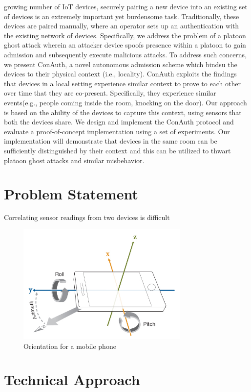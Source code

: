\documentclass[journal]{IEEEtranTIE}
\begin{document}
growing number of IoT devices, securely pairing a new device into an existing
set of devices is an extremely important yet burdensome task. Traditionally,
these devices are paired manually, where an operator sets up an authentication
with the existing network of devices. Specifically, we address the problem of a
platoon ghost attack wherein an attacker device spoofs presence within a platoon
to gain admission and subsequently execute malicious attacks. To address such
concerns, we present ConAuth, a novel autonomous admission scheme which bindsu
the devices to their physical context (i.e., locality). ConAuth exploits the
findings that devices in a local setting experience similar context to prove to
each other over time that they are co-present. Specifically, they experience
similar events(e.g., people coming inside the room, knocking on the door). Our
approach is based on the ability of the devices to capture this context, using
sensors that both the devices share. We design and implement the ConAuth
protocol and evaluate a proof-of-concept implementation using a set of
experiments. Our implementation will demonstrate that devices in the same room
can be sufficiently distinguished by their context and this can be utilized to
thwart platoon ghost attacks and similar misbehavior.

\section{Problem Statement}

Correlating sensor readings from two devices is difficult

\begin{figure}[!t]\centering
	\includegraphics[width=8.5cm]{phoneOrientation}
	\caption{Orientation for a mobile phone}\label{FIG_1}
\end{figure}


\section{Technical Approach}
\end{document}
